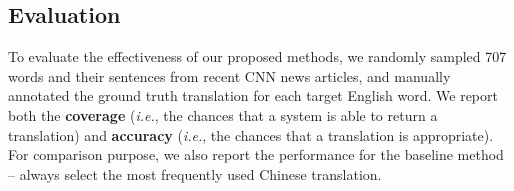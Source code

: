 \begin{CJK}{UTF8}{gbsn}


\subsection{Evaluation}
To evaluate the effectiveness of our proposed  methods, we randomly sampled 707 words and their sentences from recent CNN news articles, and manually annotated the ground truth translation for each target English word. We report both the {\bf coverage} ({\it i.e.}, the chances that a system is able to return a translation) and {\bf accuracy} ({\it i.e.}, the chances that a translation is appropriate). For comparison purpose, we also report the performance for the baseline method -- always select the most frequently used Chinese translation.



\end{CJK}
